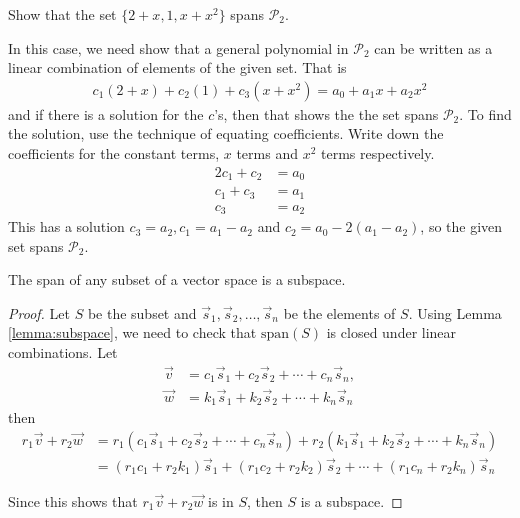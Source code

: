 \begin{example}
Show that the set $\{2+x,1,x+x^2\}$ spans $\mathcal{P}_2$.  

\solution
In this case, we need show that a general polynomial in $\mathcal{P}_2$ can be written as a linear combination of elements of the given set.  That is
%
\begin{align*}
c_1 (2+x) + c_2 (1) + c_3 (x+x^2) = a_0 + a_1 x + a_2 x^2 
\end{align*}
and if there is a solution for the $c$'s, then that shows the the set spans $\mathcal{P}_2$.  To find the solution, use the technique of equating coefficients. Write down the coefficients for the constant terms, $x$ terms and $x^2$ terms respectively. 
%
\begin{align*}
2 c_1 + c_2 & = a_0 \\
c_1 + c_3 & = a_1 \\
c_3 & = a_2 
\end{align*}
This has a solution $c_3=a_2, c_1 = a_1-a_2$ and $c_2 = a_0 - 2(a_1-a_2)$, so the given set spans $\mathcal{P}_2$.  

\end{example}


\begin{lemma}
The span of any subset of a vector space is a subspace.  
\end{lemma}

\begin{proof}
Let $S$ be the subset and $\vec{s}_1, \vec{s}_2, \ldots, \vec{s}_n$ be the elements of $S$.   Using Lemma \ref{lemma:subspace}, we need to check that $\text{span}(S)$ is closed under linear combinations.  Let
%
\begin{align*}
\vec{v} & = c_1 \vec{s}_1 + c_2 \vec{s}_2 + \cdots + c_n \vec{s}_n, \\
\vec{w} & = k_1 \vec{s}_1 + k_2 \vec{s}_2 + \cdots + k_n \vec{s}_n
\end{align*}
then 
\begin{align*}
r_1 \vec{v} + r_2 \vec{w} & = r_1 (c_1 \vec{s}_1 + c_2 \vec{s}_2 + \cdots + c_n \vec{s}_n) + 
r_2 (k_1 \vec{s}_1 + k_2 \vec{s}_2 + \cdots + k_n \vec{s}_n) \\
& = (r_1 c_1 + r_2 k_1) \vec{s}_1 + (r_1c_2 + r_2 k_2) \vec{s}_2 + \cdots + (r_1 c_n + r_2 k_n) \vec{s}_n 
\end{align*}

Since this shows that $r_1 \vec{v} + r_2 \vec{w}$ is in $S$, then $S$ is a subspace.  
\end{proof}

